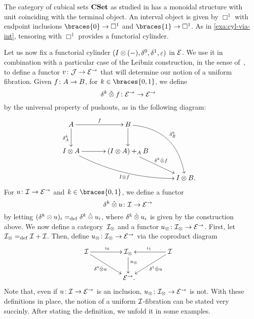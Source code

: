 \documentclass[reqno,10pt,a4paper,oneside,draft]{amsart}
\begin{document}
\begin{example} \label{exa:cyl-in-cuset}
The category of cubical sets $\CSet$ as studied in  has a monoidal structure with unit coinciding with the terminal object.
An interval object is given by $\Box^1$ with endpoint inclusions $\braces{0} \to \Box^1$ and $\braces{1} \to \Box^1$.
As in \cref{exa:cyl-via-int}, tensoring with $\Box^1$ provides a functorial cylinder.
\end{example}

Let us now fix a functorial cylinder $(\interval \otimes (-), \lcyl, \rcyl, \ccyl)$ in $\calE$.
We use it in combination with a particular case of the Leibniz construction, in the sense of~\cite{riehl-verity:reedy}, to define a functor $v \co \cal{J} \to \catE^\to$ that will determine our notion of a uniform fibration.
Given $f \co A \to B$, for $k \in \braces{0, 1}$, we define
\[
  \delta^k \hatotimes f \co \catE^\to \to \catE^\to
\]
by the universal property of pushouts, as in the following diagram:
\begin{gather*}
\xymatrix@C=1.2cm{
  A \ar[r]^{f} \ar[d]_{\kcyl_{A}} & B \ar@/^2pc/[ddr]^{\kcyl_{B}} \ar[d] & \\
  \interval \otimes A \ar@/_1pc/[drr]_{\interval \otimes f} \ar[r] & (\interval \otimes A) +_{A} B \ar[dr]^-{\delta^k \hatotimes f} & \\
  & & \interval \otimes B
\rlap{.}}
\end{gather*}
For $u \co \cal{I} \to \catE^\to$ and $k \in \braces{0, 1}$, we define a functor
\[
  \kcyl \hatotimes u \co \cal{I} \to \catE^\to
\]
by letting $(\kcyl \otimes u)_i \defeq \kcyl \hatotimes u_i$, where $\kcyl \hatotimes u_i$ is given by the construction above.
We now define a category~$\cal{I}_\otimes$ and a functor $u_\otimes \co \cal{I}_\otimes \to \catE^\to$.
First, let $\cal{I}_\otimes \defeq \cal{I} + \cal{I}$.
Then, define $u_\otimes \co \cal{I}_\otimes \to \catE^\to$ via the coproduct diagram
\begin{equation}
\label{equ:u-tensor}
\begin{gathered}
\xymatrix@C+2em{
  \cal{I} \ar[r]^{\iota_0} \ar[dr]_-{\lcyl \hatotimes u} & \cal{I}_\otimes \ar[d]^(.4){u_\otimes} & \cal{I} \ar[dl]^-{\rcyl \hatotimes u} \ar[l]_{\iota_1} \\
  & \catE^\to
\rlap{.}}
\end{gathered}
\end{equation}
Note that, even if $u \co \cal{I} \to \catE^\to$ is an inclusion, $u_\otimes \co \cal{I}_\otimes \to \catE^\to$ is not.
With these definitions in place, the notion of a uniform $\cal{I}$-fibration can be stated very succinly.
After stating the definition, we unfold it in some examples.
\end{document}
